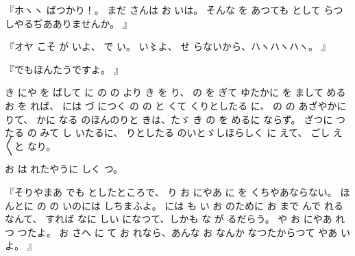 『ホヽヽ
ばつかり！。
まだ
さんは
お
いは。
そんな
を
あつても
として
らつしやるぢあありませんか。
』

『オヤ
こそ
が
いよ、
で
い。
い〻よ、%
せ
らないから、ハヽハヽハヽ。
』

『でもほんたうですよ。
』

き
にや
を
ばして
に
の
の
より
き
を
り、
の
を
ぎて
ゆたかに
を
まして
める
お
を
れば、
には
づ
につく
の
の
と
くて
くりとしたる
に、
の
の
あざやかに
りて、
かに
なる
のほんのりと
きは、たゞ
き
の
を
めるに%
ならず。
ざつに
つたる
の
みて
し
いたるに、
りとしたる
のいとゞしほらしく
に
えて、
ごし
え〳〵と
なり。

お
は
れたやうに
しく
つ。

『そりやまあ
でも
としたところで、%
り
お
にやあ
に
を
くちやあならない。
ほんとに
の
の
いのには
しちまふよ。
には
も
い
お
のために
お
まで
んで
れるなんて、
すれば
なに
しい
になつて、しかも
な
が
るだらう。
や
お
にやあ
れつ
つたよ。
お
さへ
に
て
お
れなら、あんな
お
なんか
なつたからつて
やあ
いよ。
』

